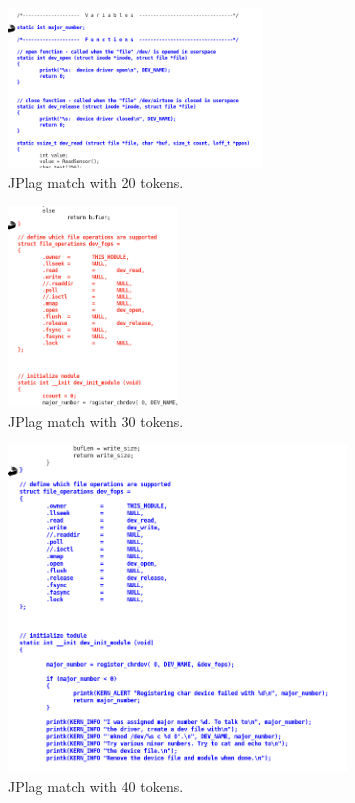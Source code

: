 \documentclass[10pt,journal,compsoc]{IEEEtran}
\begin{document}
		\begin{figure}[h!]
			\includegraphics[width=0.6\textwidth]{jplag20.png}
			\caption{JPlag match with 20 tokens.}
			\label{fig:jplag20}
		\end{figure}
		
		\begin{figure}[h!]
			\includegraphics[width=0.4\textwidth]{jplag30.png}
			\caption{JPlag match with 30 tokens.}
			\label{fig:jplag30}
		\end{figure}
		
		\begin{figure}[h!]
			\includegraphics[width=0.8\textwidth]{jplag40.png}
			\caption{JPlag match with 40 tokens.}
			\label{fig:jplag40}
		\end{figure}
		
\end{document}

